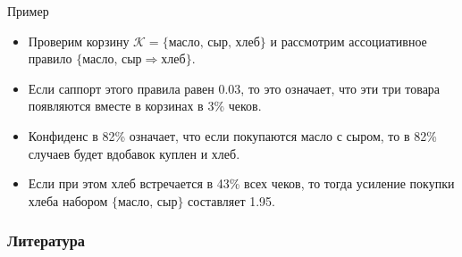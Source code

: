 \documentclass[9pt]{beamer}
\begin{document}
\begin{frame}{Пример}
\begin{itemize}
    \item Проверим корзину $\mathcal{K} = \{\text{масло, сыр, хлеб}\}$ и рассмотрим ассоциативное правило $\{\text{масло, сыр} \Rightarrow \text{хлеб}\}$.
    \item Если саппорт этого правила равен 0.03, то это означает, что эти три товара появляются вместе в корзинах в 3\% чеков.
    \item Конфиденс в 82\% означает, что если покупаются масло с сыром, то в 82\% случаев будет вдобавок куплен и хлеб.
    \item Если при этом хлеб встречается в 43\% всех чеков, то тогда усиление покупки хлеба набором $\{\text{масло, сыр}\}$ составляет 1.95. 
\end{itemize}
\end{frame}



\begin{frame}[allowframebreaks]
    \frametitle{Литература}
    
    \nocite{esl}
    \nocite{arules_habr}
    
\end{frame}
\end{document}
